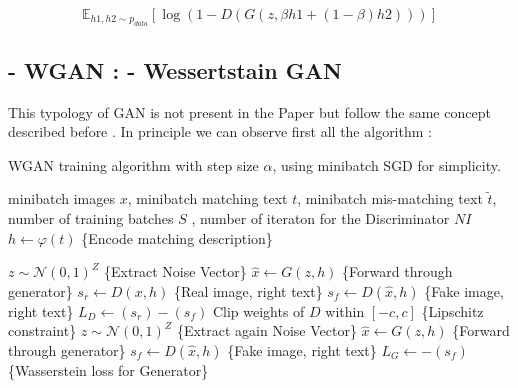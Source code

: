\begin{equation}
    \mathbb{E}_{h1,h2 \sim p_{data} } [\log( 1 - D(G( z , \beta h1 + 
    (1-\beta) h2 )))]
\end{equation}

\subsection*{- WGAN : - Wessertstain GAN}
This typology of GAN is not present in the Paper but follow the same concept 
described before . 
In principle we can observe first all the algorithm :

\begin{algorithm}
    \caption{WGAN training algorithm with step size $\alpha$, using minibatch SGD for simplicity.}
    \begin{algorithmic}
        \Require minibatch images $x$, minibatch matching text $t$, minibatch mis-matching text $\tilde{t}$, 
        number of training batches $S$ , number of iteraton for the Discriminator $NI$ 
            \State $h \leftarrow \varphi(t)$ \hfill \{Encode matching description\}
            
                \State $z \sim \mathcal{N}(0, 1)^Z$ \hfill \{Extract Noise Vector\}
                \State $\hat{x} \leftarrow G(z, h)$ \hfill \{Forward through generator\}
                \State $s_r \leftarrow D(x, h)$ \hfill \{Real image, right text\}
                \State $s_f \leftarrow D(\hat{x}, h)$ \hfill \{Fake image, right text\}
                \State $L_D \leftarrow (s_r) - (s_f) $
                \State Clip weights of $D$ within $[-c, c]$
                \State \{Lipschitz constraint\}
            \EndFor
            \State $z \sim \mathcal{N}(0, 1)^Z$ \hfill \{Extract again Noise Vector\}
            \State $\hat{x} \leftarrow G(z, h)$ \hfill \{Forward through generator\}
            \State $s_f \leftarrow D(\hat{x}, h)$ \hfill \{Fake image, right text\}
            \State $L_G \leftarrow -(s_f) $ \hfill \{Wasserstein loss for Generator\}
            \EndFor
    \end{algorithmic}
\end{algorithm}

